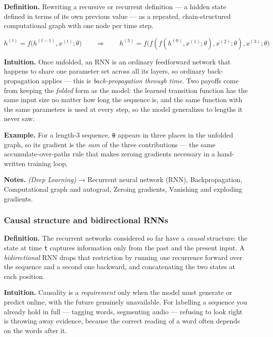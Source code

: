 \documentclass[
  10pt,
  letterpaper,
  onecolumn]{article}
\begin{document}
\textbf{Definition.} Rewriting a recursive or recurrent definition ---
a hidden state defined in terms of its own previous value --- as a
repeated, chain-structured computational graph with one node per time
step.

\begin{equation*}
h^{(t)}=f\bigl(h^{(t-1)},x^{(t)};\theta\bigr)
\qquad\Longrightarrow\qquad
h^{(3)}=f\bigl(f(f(h^{(0)},x^{(1)};\theta),x^{(2)};\theta),x^{(3)};\theta\bigr)
\end{equation*}

\textbf{Intuition.} Once unfolded, an RNN is an ordinary feedforward
network that happens to share one parameter set across all its layers,
so ordinary back-propagation applies --- this is
\emph{back-propagation through time}. Two payoffs come from keeping the
\emph{folded} form as the model: the learned transition function has the
same input size no matter how long the sequence is, and the same
function with the same parameters is used at every step, so the model
generalizes to lengths it never saw.

\textbf{Example.} For a length-3 sequence, \texttt{θ} appears in three
places in the unfolded graph, so its gradient is the \emph{sum} of the
three contributions --- the same accumulate-over-paths rule that makes
zeroing gradients necessary in a hand-written training loop.

\textbf{Notes.} \emph{(Deep Learning)} → Recurrent neural network (RNN),
Backpropagation, Computational graph and autograd, Zeroing gradients,
Vanishing and exploding gradients.

\hypertarget{causal-structure-and-bidirectional-rnns}{%
\subsubsection{Causal structure and bidirectional
RNNs}\label{causal-structure-and-bidirectional-rnns}}

\textbf{Definition.} The recurrent networks considered so far have a
\emph{causal} structure: the state at time \texttt{t} captures
information only from the past and the present input. A
\emph{bidirectional} RNN drops that restriction by running one
recurrence forward over the sequence and a second one backward, and
concatenating the two states at each position.

\textbf{Intuition.} Causality is a \emph{requirement} only when the
model must generate or predict online, with the future genuinely
unavailable. For labelling a sequence you already hold in full ---
tagging words, segmenting audio --- refusing to look right is throwing
away evidence, because the correct reading of a word often depends on
the words after it.
\end{document}
